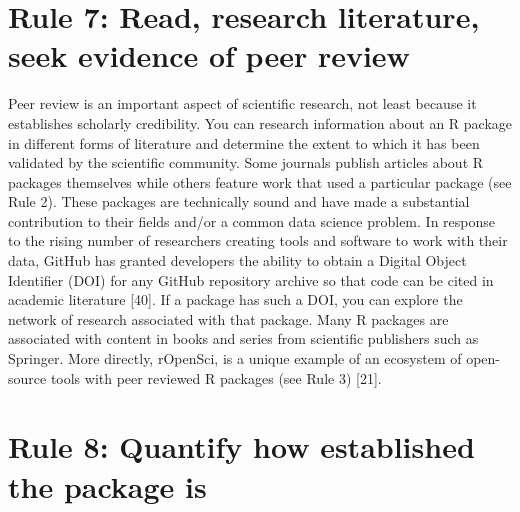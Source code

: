 \documentclass[10pt,letterpaper]{article}
\begin{document}
\hypertarget{rule-7-read-research-literature-seek-evidence-of-peer-review}{%
\section{Rule 7: Read, research literature, seek evidence of peer
review}\label{rule-7-read-research-literature-seek-evidence-of-peer-review}}

Peer review is an important aspect of scientific research, not least
because it establishes scholarly credibility. You can research
information about an R package in different forms of literature and
determine the extent to which it has been validated by the scientific
community. Some journals publish articles about R packages themselves
while others feature work that used a particular package (see Rule 2).
These packages are technically sound and have made a substantial
contribution to their fields and/or a common data science problem. In
response to the rising number of researchers creating tools and software
to work with their data, GitHub has granted developers the ability to
obtain a Digital Object Identifier (DOI) for any GitHub repository
archive so that code can be cited in academic literature {[}40{]}. If a
package has such a DOI, you can explore the network of research
associated with that package. Many R packages are associated with
content in books and series from scientific publishers such as Springer.
More directly, rOpenSci, is a unique example of an ecosystem of
open-source tools with peer reviewed R packages (see Rule 3) {[}21{]}.

\hypertarget{rule-8-quantify-how-established-the-package-is}{%
\section{Rule 8: Quantify how established the package
is}\label{rule-8-quantify-how-established-the-package-is}}
\end{document}
